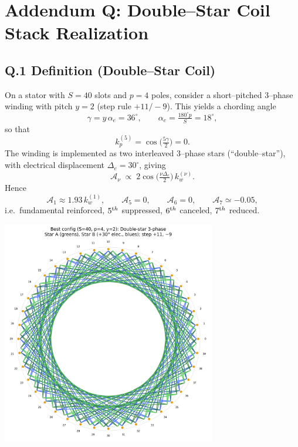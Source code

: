 \documentclass[11pt,a4paper]{article}
\begin{document}
\section*{Addendum Q: Double--Star Coil Stack Realization}
\label{sec:addendumQ}

\subsection*{Q.1 Definition (Double--Star Coil)}
On a stator with $S=40$ slots and $p=4$ poles, consider a short--pitched
3--phase winding with pitch $y=2$ (step rule $+11/−9$).
This yields a chording angle
\[
	\gamma = y\,\alpha_e = 36^\circ,
	\qquad
	\alpha_e = \tfrac{180^\circ p}{S} = 18^\circ,
\]
so that
\[
	k_p^{(5)}=\cos\!\big(\tfrac{5\gamma}{2}\big)=0.
\]
The winding is implemented as two interleaved 3--phase stars (``double--star''),
with electrical displacement $\Delta_e=30^\circ$, giving
\[
	\mathcal A_\nu \;\propto\; 2\cos\!\Big(\tfrac{\nu\Delta_e}{2}\Big)\,k_w^{(\nu)}.
\]
Hence
\[
	\mathcal A_1 \approx 1.93\,k_w^{(1)},\qquad
	\mathcal A_5=0,\qquad
	\mathcal A_6=0,\qquad
	\mathcal A_7\simeq -0.05,
\]
i.e.\ fundamental reinforced, $5^{\textrm th}$ suppressed, $6^{\textrm th}$ canceled,
$7^{\textrm th}$ reduced.

\begin{center}
    \includegraphics[width=0.7\textwidth]{S40_double_star_best}
\end{center}
\end{document}
